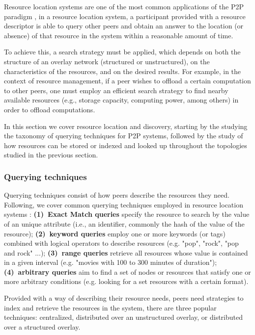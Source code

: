 

Resource location systems are one of the most common applications of the P2P paradigm \cite{leitaoPHDthesis}, in a resource location system, a participant provided with a resource descriptor is able to query other peers and obtain an answer to the location (or absence) of that resource in the system within a reasonable amount of time.

To achieve this, a search strategy must be applied, which depends on both the structure of an overlay network (structured or unstructured), on the characteristics of the resources, and on the desired results. For example, in the context of resource management, if a peer wishes to offload a certain computation to other peers, one must employ an efficient search strategy to find nearby available resources (e.g., storage capacity, computing power, among others) in order to offload computations.

In this section we cover resource location and discovery, starting by the studying the taxonomy of querying techniques for P2P systems, followed by the study of how resources can be stored or indexed and looked up throughout the topologies studied in the previous section.

\subsubsection*{Querying techniques}

Querying techniques consist of how peers describe the resources they need. Following, we cover common querying techniques employed in resource location systems \cite{leitaoPHDthesis}: \textbf{(1)~Exact Match queries} specify the resource to search by the value of an unique attribute (i.e., an identifier, commonly the hash of the value of the resource); \textbf{(2)~keyword queries} employ one or more keywords (or tags) combined with logical operators to describe resources (e.g. "pop", "rock", "pop and rock" ...); \textbf{(3)~range queries} retrieve all resources whose value is contained in a given interval (e.g. "movies with 100 to 300 minutes of duration"); \textbf{(4)~arbitrary queries} aim to find a set of nodes or resources that satisfy one or more arbitrary conditions (e.g. looking for a set resources with a certain format).

Provided with a way of describing their resource needs, peers need strategies to index and retrieve the resources in the system, there are three popular techniques: centralized, distributed over an unstructured overlay, or distributed over a structured overlay.


